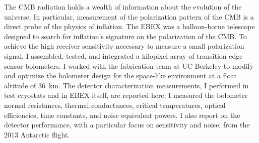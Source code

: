 
The \ac{CMB} radiation holds a wealth of information about the evolution of the universe. 
In particular, measurement of the polarization pattern of the \ac{CMB} is a direct probe of the physics of inflation. 
The \ac{EBEX} was a balloon-borne telescope designed to search for inflation's signature on the polarization of the \ac{CMB}.  
To achieve the high receiver sensitivity necessary to measure a small polarization signal, I assembled, tested, and integrated a kilopixel array of transition edge sensor bolometers. 
I worked with the fabrication team at UC Berkeley to modify and optimize the bolometer design for the space-like environment at a float altitude of 36~km. 
The detector characterization measurements, I performed in test cryostats and in \ac{EBEX} itself, are reported here. 
I measured the bolometer normal resistances, thermal conductances, critical temperatures, optical efficiencies, time constants, and noise equivalent powers. 
I also report on the detector performance, with a particular focus on sensitivity and noise, from the 2013 Antarctic flight. 


